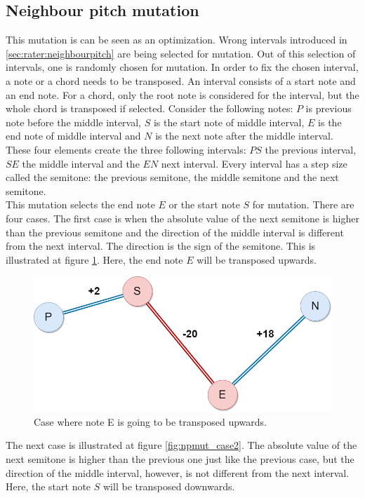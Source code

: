 \subsection{Neighbour pitch mutation}
This mutation is can be seen as an optimization. Wrong intervals introduced in \ref{sec:rater:neighbourpitch} are being selected for mutation. Out of this selection of intervals, one is randomly chosen for mutation. In order to fix the chosen interval, a note or a chord needs to be transposed. An interval consists of a start note and an end note. For a chord, only the root note is considered for the interval, but the whole chord is transposed if selected. Consider the following notes:
$P$ is previous note before the middle interval, $S$ is the start note of middle interval, $E$ is the end note of middle interval and $N$ is the next note after the middle interval. These four elements create the three following intervals: $PS$ the previous interval, $SE$ the middle interval and the $EN$ next interval. Every interval has a step size called the semitone: the previous semitone, the middle semitone and the next semitone. 
\\
This mutation selects the end note $E$ or the start note $S$ for mutation. There are four cases. The first case is when the absolute value of the next semitone is higher than the previous semitone and the direction of the middle interval is different from the next interval. The direction is the sign of the semitone. This is illustrated at figure \ref{fig:npmut_case1}. Here, the end note $E$ will be transposed upwards.

\begin{figure}[H]
	\includegraphics[width=\linewidth]{Fotos/np_mutation/Case1.png}
	\caption{Case where note E is going to be transposed upwards.}
	\label{fig:npmut_case1}
\end{figure}

The next case is illustrated at figure \ref{fig:npmut_case2}. The absolute value of the next semitone is higher than the previous one just like the previous case, but the direction of the middle interval, however, is not different from the next interval. Here, the start note $S$ will be transposed downwards.

